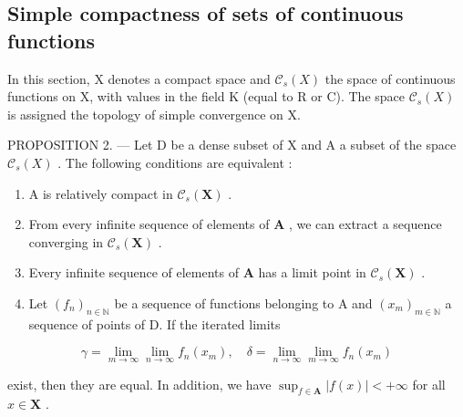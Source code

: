 \subsection{Simple compactness of sets of continuous functions}

In this section, X denotes a compact space and \(\mathcal{C}_{s}(X)\) the space of continuous functions on X, with values in the field K (equal to R or C). The space \(\mathcal{C}_{s}(X)\) is assigned the topology of simple convergence on X.

PROPOSITION 2. --- Let D be a dense subset of X and A a subset of the space \(\mathcal{C}_{s}(X)\) . The following conditions are equivalent :

\begin{enumerate}
\def\labelenumi{(\roman{enumi})}
\item
  A is relatively compact in \(\mathcal{C}_s(\mathbf{X})\) .
\item
  From every infinite sequence of elements of \(\mathbf{A}\) , we can extract a sequence converging in \(\mathcal{C}_s(\mathbf{X})\) .
\item
  Every infinite sequence of elements of \(\mathbf{A}\) has a limit point in \(\mathcal{C}_s(\mathbf{X})\) .
\item
  Let \((f_n)_{n\in \mathbb{N}}\) be a sequence of functions belonging to A and \((x_m)_{m\in \mathbb{N}}\) a sequence of points of D. If the iterated limits
\end{enumerate}

\[
\gamma = \lim _ {m \rightarrow \infty} \lim _ {n \rightarrow \infty} f _ {n} (x _ {m}), \quad \delta = \lim _ {n \rightarrow \infty} \lim _ {m \rightarrow \infty} f _ {n} (x _ {m})
\]

exist, then they are equal. In addition, we have \(\sup_{f\in \mathbf{A}}|f(x)| < +\infty\) for all \(x\in \mathbf{X}\) .

